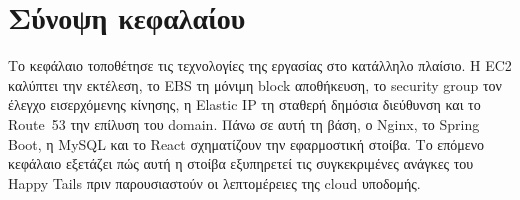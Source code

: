 \section{Σύνοψη κεφαλαίου}

Το κεφάλαιο τοποθέτησε τις τεχνολογίες της εργασίας στο κατάλληλο πλαίσιο.
Η EC2 καλύπτει την εκτέλεση, το EBS τη μόνιμη block αποθήκευση, το security
group τον έλεγχο εισερχόμενης κίνησης, η Elastic IP τη σταθερή δημόσια
διεύθυνση και το Route~53 την επίλυση του domain. Πάνω σε αυτή τη βάση, ο
Nginx, το Spring Boot, η MySQL και το React σχηματίζουν την εφαρμοστική
στοίβα. Το επόμενο κεφάλαιο εξετάζει πώς αυτή η στοίβα εξυπηρετεί τις
συγκεκριμένες ανάγκες του Happy Tails πριν παρουσιαστούν οι λεπτομέρειες της
cloud υποδομής.
